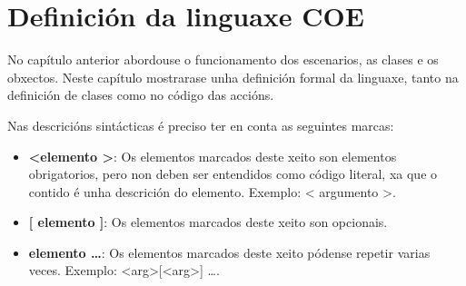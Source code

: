\chapter{Definición da linguaxe COE}
\label{ch:definicion}
No capítulo anterior abordouse o funcionamento dos escenarios, as clases e os
obxectos. Neste capítulo mostrarase unha definición formal da linguaxe, tanto na
definición de clases como no código das accións.
\par
Nas descricións sintácticas é preciso ter en conta as seguintes marcas:
\begin{itemize}
  \item {\bf \textless elemento \textgreater}: Os elementos marcados deste
  xeito son elementos obrigatorios, pero non deben ser entendidos como código
  literal, xa que o contido é unha descrición do elemento. Exemplo: \textless
  argumento \textgreater.
  \item {\bf [ elemento ]}: Os elementos marcados deste xeito son opcionais.
  \item {\bf elemento \ldots}: Os elementos marcados deste xeito pódense repetir
  varias veces. Exemplo: \textless arg\textgreater {}[\textless arg\textgreater]
  \ldots.
\end{itemize}


